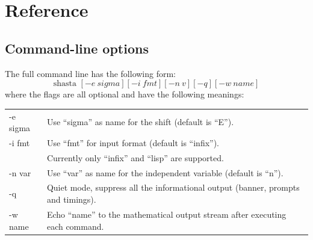 % 
% 
% 
% 
% 
\section{Reference}

\subsection{Command-line options}
The full \shasta{} command line has the following form:
$$
\mbox{shasta~} [-e~sigma] [-i~fmt] [-n~v] [-q] [-w~name]
$$
where the flags are all optional and have the following meanings:\\
\begin{tabular}{ll}
-e sigma& Use ``sigma'' as name for the shift (default is ``E'').\\
-i fmt  & Use ``fmt'' for input format (default is ``infix'').\\
        & Currently only ``infix'' and ``lisp'' are supported.\\
-n var  & Use ``var'' as name for the independent variable (default is ``n'').\\
-q      & Quiet mode, suppress all the informational output (banner, prompts and
          timings).\\
-w name & Echo ``name'' to the mathematical output stream after executing each
          command.\\
\end{tabular}


